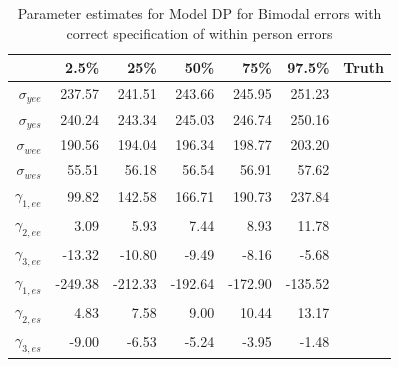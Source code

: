 \documentclass[11pt]{article}\usepackage[]{graphicx}\usepackage[]{color}
\begin{document}
\begin{table}[ht]
\centering
\begin{tabular}{rrrrrr|r}
  \hline
 & 2.5\% & 25\% & 50\% & 75\% & 97.5\% & Truth \\
  \hline
$\sigma_{yee}$ & 237.57 & 241.51 & 243.66 & 245.95 & 251.23 \\ 
  $\sigma_{yes}$ & 240.24 & 243.34 & 245.03 & 246.74 & 250.16 \\ 
  $\sigma_{wee}$ & 190.56 & 194.04 & 196.34 & 198.77 & 203.20 \\ 
  $\sigma_{wes}$ & 55.51 & 56.18 & 56.54 & 56.91 & 57.62 \\ 
  $\gamma_{1,ee}$ & 99.82 & 142.58 & 166.71 & 190.73 & 237.84 \\ 
  $\gamma_{2,ee}$ & 3.09 & 5.93 & 7.44 & 8.93 & 11.78 \\ 
  $\gamma_{3,ee}$ & -13.32 & -10.80 & -9.49 & -8.16 & -5.68 \\ 
  $\gamma_{1,es}$ & -249.38 & -212.33 & -192.64 & -172.90 & -135.52 \\ 
  $\gamma_{2,es}$ & 4.83 & 7.58 & 9.00 & 10.44 & 13.17 \\ 
  $\gamma_{3,es}$ & -9.00 & -6.53 & -5.24 & -3.95 & -1.48 \\ 
   \hline
\end{tabular}
\caption{Parameter estimates for Model DP for Bimodal errors with correct specification of within person errors}
\label{mdpbwpestimates}
\end{table}
% 
% 
% 
% 
\end{document}
